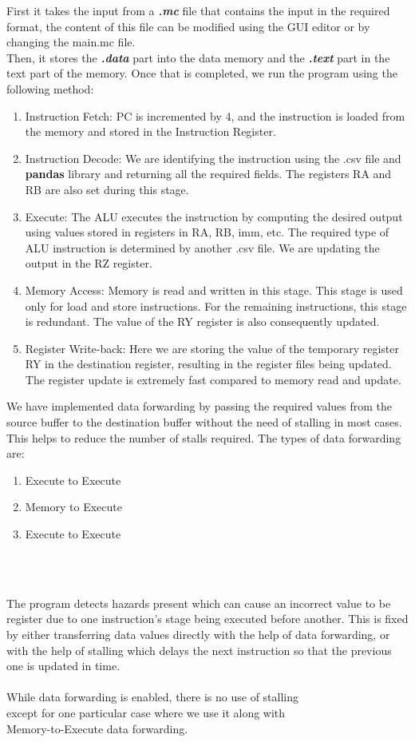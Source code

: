 \documentclass{article}
\begin{document}
First it takes the input from a \textsl{\textbf{.mc}} file that contains the input in the required format, the content of this file can be modified using the GUI editor or by changing the main.mc file.\\
Then, it stores the \textsl{\textbf{.data}} part into the data memory and the \textsl{\textbf{.text}} part in the text part of the memory.
Once that is completed, we run the program using the following method:
\begin{enumerate}
\item Instruction Fetch: PC is incremented by 4, and the instruction is loaded from the memory and stored in the Instruction Register.
\item Instruction Decode: We are identifying the instruction using the .csv file and {\bf pandas} library and returning all the required fields. The registers RA and RB are also set during this stage.
\item Execute: The ALU executes the instruction by computing the desired output using values stored in registers in RA, RB, imm, etc. The required type of ALU instruction is determined by another .csv file. We are updating the output in the RZ register.
\item Memory Access: Memory is read and written in this stage. This stage is used only for load and store instructions. For the remaining instructions, this stage is redundant. The value of the RY register is also consequently updated.
\item Register Write-back: Here we are storing the value of the temporary register RY in the destination register, resulting in the register files being updated. The register update is extremely fast compared to memory read and update.
\end{enumerate}
\newpage
We have implemented data forwarding by passing the required values from the source buffer to the destination buffer without the need of stalling in most cases. This helps to reduce the number of stalls required. The types of data forwarding are:
\begin{enumerate}
    \item Execute to Execute
    \item Memory to Execute
    \item Execute to Execute
\end{enumerate}
\\
\vspace{1cm}

\vspace{1cm}\\
The program detects hazards present which can cause an incorrect value to be register due to one instruction's stage being executed before another. This is fixed by either transferring data values directly with the help of data forwarding, or with the help of stalling which delays the next instruction so that the previous one is updated in time.\\\\
While data forwarding is enabled, there is no use of stalling\\ except for one particular case where we use it along with \\Memory-to-Execute data forwarding.
\end{document}
